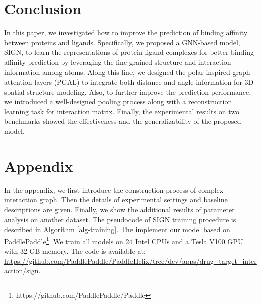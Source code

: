 \documentclass[sigconf]{acmart}
\newcommand{\model}{\textsf{SIGN}\xspace}
\newcommand{\gnn}{PGAL\xspace}
\begin{document}
\vspace{-3mm}





 \section{Conclusion}
In this paper, we investigated how to improve the prediction of binding affinity between proteins and ligands. Specifically, we proposed a  GNN-based model, \model, to learn the representations of protein-ligand complexes for better binding affinity prediction by leveraging the fine-grained structure and interaction information among atoms. Along this line, we designed the polar-inspired graph attention layers (\gnn) to integrate both distance and angle information for 3D spatial structure modeling. Also, to further improve the prediction performance, we introduced a well-designed pooling process along with a reconstruction learning task for interaction matrix. Finally, the experimental results on two benchmarks showed the effectiveness and the generalizability of the proposed model.
\vspace{-3mm}

 


\normalem



\appendix
\section{Appendix}
In the appendix, we first introduce the construction process of complex interaction graph. Then the details of experimental settings and baseline descriptions are given.
Finally, we show the additional results of parameter analysis on another dataset. 
The pseudocode of \model training procedure is described in Algorithm \ref{alg-training}. 
The implement our model based on PaddlePaddle\footnote{https://github.com/PaddlePaddle/Paddle}.  We train all models on 24 Intel CPUs and a Tesla V100 GPU with 32 GB memory.
The code is available at: \url{https://github.com/PaddlePaddle/PaddleHelix/tree/dev/apps/drug_target_interaction/sign}.
\end{document}

